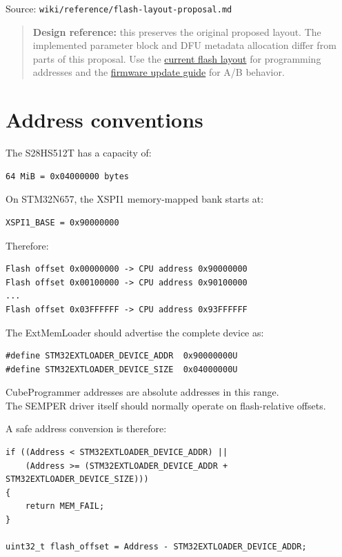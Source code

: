 \documentclass[10pt,a4paper,oneside]{report}
\begin{document}
{\small\color{MGSMuted}Source: \nolinkurl{wiki/reference/flash-layout-proposal.md}\par}\medskip

\begin{quote}
\textbf{Design reference:} this preserves the original proposed layout. The implemented parameter block and DFU metadata allocation differ from parts of this proposal. Use the \hyperref[wiki-hardware-flash-layout--current-external-flash-layout]{current flash layout} for programming addresses and the \hyperref[wiki-firmware-firmware-updates--application-firmware-updates-and-ab-recovery]{firmware update guide} for A/B behavior.
\end{quote}

\section{Address conventions}\label{wiki-reference-flash-layout-proposal--1-address-conventions}

The S28HS512T has a capacity of:

\begin{verbatim}
64 MiB = 0x04000000 bytes
\end{verbatim}

On STM32N657, the XSPI1 memory-mapped bank starts at:

\begin{verbatim}
XSPI1_BASE = 0x90000000
\end{verbatim}

Therefore:

\begin{verbatim}
Flash offset 0x00000000 -> CPU address 0x90000000
Flash offset 0x00100000 -> CPU address 0x90100000
...
Flash offset 0x03FFFFFF -> CPU address 0x93FFFFFF
\end{verbatim}

The ExtMemLoader should advertise the complete device as:

\begin{verbatim}
#define STM32EXTLOADER_DEVICE_ADDR  0x90000000U
#define STM32EXTLOADER_DEVICE_SIZE  0x04000000U
\end{verbatim}

CubeProgrammer addresses are absolute addresses in this range.\\
The SEMPER driver itself should normally operate on flash-relative offsets.

A safe address conversion is therefore:

\begin{verbatim}
if ((Address < STM32EXTLOADER_DEVICE_ADDR) ||
    (Address >= (STM32EXTLOADER_DEVICE_ADDR + STM32EXTLOADER_DEVICE_SIZE)))
{
    return MEM_FAIL;
}

uint32_t flash_offset = Address - STM32EXTLOADER_DEVICE_ADDR;
\end{verbatim}
\end{document}
